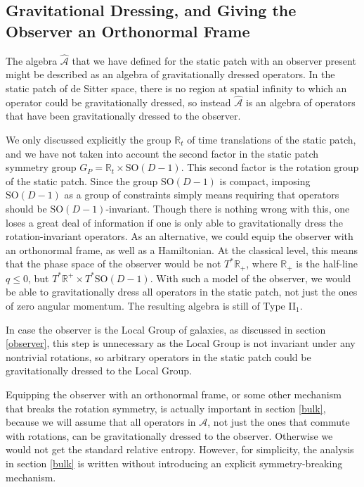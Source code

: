 \documentclass[11pt,a4paper]{article}
\def\h{\widehat}
\def\A{{\mathcal A}}
\def\R{{\mathbb R}}
\def\h{\widehat}
\def\SO{{\mathrm{SO}}}
\begin{document}
\subsection{Gravitational Dressing, and Giving the Observer an Orthonormal Frame}\label{frame}

The algebra $\h\A$ that we have defined for the static patch with an observer present might be described as an algebra of gravitationally dressed operators.   In the
static patch of de Sitter space, there is no region at spatial infinity to which an operator could be gravitationally dressed, so instead $\h\A$ is an algebra of operators
that have been gravitationally dressed to the observer.   

We only discussed explicitly the group $\R_t$ of time translations of the static patch, and we have not taken into account the second factor
in the static patch symmetry group $G_P=\R_t\times \SO(D-1)$.   This second factor is the rotation group of the static patch.   Since the group $\SO(D-1)$ is
compact, imposing  $\SO(D-1)$ as a group of constraints simply means requiring that operators should be $\SO(D-1)$-invariant.   Though there is nothing wrong
with this, one loses a great deal of information if one is only able to gravitationally dress the rotation-invariant operators.   As an alternative, we could equip
the observer with an orthonormal frame, as well as a Hamiltonian.   At the classical level, this means that the phase space of the observer would be not
$T^*\R_+$, where $\R_+$ is the half-line $q\leq 0$, but $T^*\R^+\times T^*\SO(D-1)$.   With such a model of the observer, we would be able to gravitationally
dress all operators in the static patch, not just the ones of zero angular momentum.   The resulting algebra is still of Type II$_1$.  

In case the observer is the Local Group of galaxies, as discussed in section \ref{observer}, this step is unnecessary as the Local Group is not invariant under
any nontrivial rotations, so arbitrary operators in the static patch could be gravitationally dressed to the Local Group.

Equipping the observer with an orthonormal frame, or some other mechanism that breaks the rotation symmetry, is actually important in section \ref{bulk},
because we will  assume that all operators in $\A$, not just the ones that commute with rotations, can be gravitationally dressed to the observer.   Otherwise
we would not get the standard relative entropy.    However, for simplicity, the analysis in section \ref{bulk} is written without introducing an explicit symmetry-breaking
mechanism.
\end{document}
